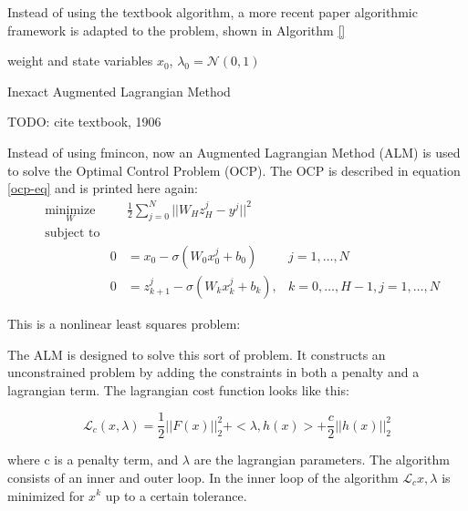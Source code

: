 Instead of using the textbook algorithm, a more recent paper algorithmic framework is adapted to the problem, shown in Algorithm \ref{}

\begin{algorithm}[H]
\SetAlgoLined
{}
weight and state variables $x_0$,  $\lambda_0 = \mathcal{N}(0,1)$ \;
 \caption{Inexact Augmented Lagrangian Method}
\end{algorithm}


TODO: cite textbook, 1906


Instead of using fmincon, now an Augmented Lagrangian Method (ALM) is used to solve the Optimal Control Problem (OCP). The OCP is described in equation \ref{ocp-eq} and is printed here again:
\begin{equation*}
	\begin{aligned}
	& \underset{W}{\text{minimize}}
	& & \frac{1}{2}\sum\limits_{j=0}^{N}||W_Hz_H^j - y^j||^2 \\
	& \text{subject to} \\
	& & 0 &= x_0 - \sigma(W_0x_0^j + b_0) &j = 1,\ldots,N \\
	& & 0 &= z_{k+1}^j - \sigma(W_kx_k^j + b_k), &k = 0,\ldots,H-1,j = 1,\ldots,N
	\end{aligned}
\end{equation*}

This is a nonlinear least squares problem:


The ALM is designed to solve this sort of problem. It constructs an unconstrained problem by adding the constraints in both a penalty and a lagrangian term. The lagrangian cost function looks like this:

\begin{equation}
\mathcal{L}_c(x,\lambda) = \frac{1}{2} ||F(x)||^2_2 + <\lambda,h(x)> + \frac{c}{2} || h(x) ||^2_2
\end{equation}

where c is a penalty term, and $\lambda$ are the lagrangian parameters. The algorithm consists of an inner and outer loop. In the inner loop of the algorithm $\mathcal{L}_c{x,\lambda}$ is minimized for $x^k$ up to a certain tolerance.

